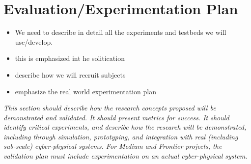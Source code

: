 \section{Evaluation/Experimentation Plan}
\label{sec:experiment}

\begin{itemize}
    \item We need to describe in detail all the experiments and testbeds we will use/develop.
    \item this is emphasized int he solitication
    \item describe how we will recruit subjects
    \item emphasize the real world experimentation plan
\end{itemize}

\textit{This section should describe how the research concepts proposed will be demonstrated and validated. It should present metrics for success. It should identify critical experiments, and describe how the research will be demonstrated, including through simulation, prototyping, and integration with real (including sub-scale) cyber-physical systems. For Medium and Frontier projects, the validation plan must include experimentation on an actual cyber-physical system.}

